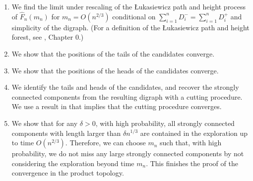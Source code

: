 \begin{enumerate}
    \item We find the limit under rescaling of the \L ukasiewicz path and height process of $\hat{F}_n(m_n)$ for $m_n=O(n^{2/3})$ conditional on $\sum_{i=1}^n D^-_i=\sum_{i=1}^n D^+_i$ and simplicity of the digraph. (For a definition of the \L ukasiewicz path and height forest, see \cite{AST_2002__281__R1_0}, Chapter 0.)
    \item We show that the positions of the tails of the candidates converge.
    \item We show that the positions of the heads of the candidates converge.
    \item We identify the tails and heads of the candidates, and recover the strongly connected components from the resulting digraph with a cutting procedure. We use a result in \cite{goldschmidtScalingLimitCritical2019} that implies that the cutting procedure converges.
    \item We show that for any $\delta>0$, with high probability, all strongly connected components with length larger than $\delta n^{1/3}$ are contained in the exploration up to time $O(n^{2/3})$. Therefore, we can choose $m_n$ such that, with high probability, we do not miss any large strongly connected components by not considering the exploration beyond time $m_n$. This finishes the proof of the convergence in the product topology.
\end{enumerate}


